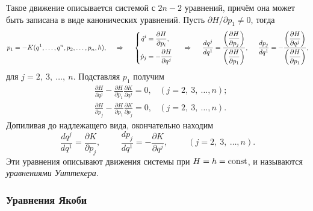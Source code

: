 Такое движение описывается системой с $2n-2$ уравнений, причём она может быть записана в виде канонических уравнений. Пусть $\partial H / \partial p_1 \neq 0$, тогда
\begin{equation*}
    p_1 = - K(q^1, \ldots, q^n, p_2, \ldots, p_n, h),
    \hspace{0.5cm} \Rightarrow \hspace{0.5cm} 
    \left\{\begin{aligned}
        \dot{q}^i &= \frac{\partial H}{\partial p_i}, \\
        \dot{p}_j &= - \frac{\partial H}{\partial q^j}        
    \end{aligned}\right.
    \hspace{0.5cm} \Rightarrow \hspace{0.5cm} 
    \frac{d q^j}{d q^1} = \frac{
    \left(\dfrac{\partial H}{\partial p_j} \right)
    }{
    \left(\dfrac{\partial H}{\partial p_1} \right)
    },
    \hspace{0.5cm} 
    \frac{d p_j}{d q^1} = - \frac{
    \left(\dfrac{\partial H}{\partial q^j}\right)
    }{
    \left(\dfrac{\partial H}{\partial p_1} \right)
    },
\end{equation*}
для $j = 2,\ 3,\ \ldots,\ n$. Подставляя $p_1$ получим
\begin{align*}
    &\frac{\partial H}{\partial q^j} - \frac{\partial H}{\partial p_1} \frac{\partial K}{\partial q^j} = 0,
    &(j = 2, \ 3, \ \ldots, n);
    \\
    &\frac{\partial H}{\partial p_j} - \frac{\partial H}{\partial p_1} \frac{\partial K}{\partial p_j}  = 0,
    &(j = 2, \ 3, \ \ldots, n).
\end{align*}
Допиливая до надлежащего вида, окончательно находим
\begin{equation*}
    \frac{d q^j}{d q^1} = \frac{\partial K}{\partial p_j},
    \hspace{1cm} 
    \frac{d p_j}{d q^1} = - \frac{\partial K}{\partial q^j},
    \hspace{1cm} 
    (j = 2, \ 3, \ \ldots, n).
\end{equation*}
Эти уравнения описывают движения системы при $H = h = \text{const}$, и называются \textit{уравнениями Уиттекера}. 

\subsubsection*{Уравнения Якоби}


